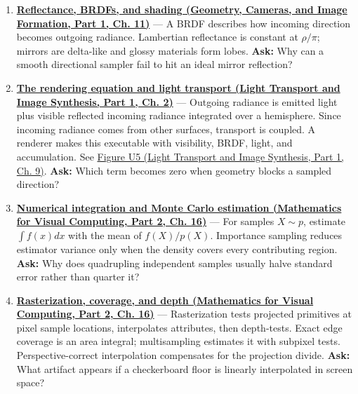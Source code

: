 \begin{enumerate}
\item
  \textbf{\href{../03-Geometry-Cameras-and-Image-Formation-P01/main.pdf\#03-visual-computing-i-ch004-reflectance-brdfs-and-shading}{Reflectance, BRDFs, and shading (Geometry, Cameras, and Image Formation, Part 1, Ch. 11)}} --- A BRDF describes how incoming direction becomes outgoing radiance. Lambertian reflectance is constant at \(\rho/\pi\); mirrors are delta-like and glossy materials form lobes. \textbf{Ask:} Why can a smooth directional sampler fail to hit an ideal mirror reflection?
\item
  \textbf{\href{../04-Light-Transport-and-Image-Synthesis-P01/main.pdf\#03-visual-computing-i-ch007-the-rendering-equation-and-light-transport}{The rendering equation and light transport (Light Transport and Image Synthesis, Part 1, Ch. 2)}} --- Outgoing radiance is emitted light plus visible reflected incoming radiance integrated over a hemisphere. Since incoming radiance comes from other surfaces, transport is coupled. A renderer makes this executable with visibility, BRDF, light, and accumulation. See \href{../04-Light-Transport-and-Image-Synthesis-P01/main.pdf\#04-visual-computing-ii-ch035-figure-u5---a-direct-light-renderer-makes-the-pipeline-executable}{Figure U5 (Light Transport and Image Synthesis, Part 1, Ch. 9)}. \textbf{Ask:} Which term becomes zero when geometry blocks a sampled direction?
\item
  \textbf{\href{../02-Mathematics-for-Visual-Computing-P02/main.pdf\#03-visual-computing-i-ch012-numerical-integration-and-monte-carlo-estimation}{Numerical integration and Monte Carlo estimation (Mathematics for Visual Computing, Part 2, Ch. 16)}} --- For samples \(X\sim p\), estimate \(\int f(x)dx\) with the mean of \(f(X)/p(X)\). Importance sampling reduces estimator variance only when the density covers every contributing region. \textbf{Ask:} Why does quadrupling independent samples usually halve standard error rather than quarter it?
\item
  \textbf{\href{../02-Mathematics-for-Visual-Computing-P02/main.pdf\#03-visual-computing-i-ch012-rasterization-coverage-and-depth}{Rasterization, coverage, and depth (Mathematics for Visual Computing, Part 2, Ch. 16)}} --- Rasterization tests projected primitives at pixel sample locations, interpolates attributes, then depth-tests. Exact edge coverage is an area integral; multisampling estimates it with subpixel tests. Perspective-correct interpolation compensates for the projection divide. \textbf{Ask:} What artifact appears if a checkerboard floor is linearly interpolated in screen space?

\end{enumerate}

